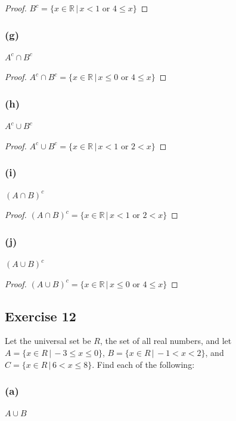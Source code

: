 \documentclass[14pt]{extarticle}
\newcommand{\R}{\mathbb{R}}
\begin{document}
\begin{proof}
\(B^c = \{x \in \R \, | \, x < 1 \text{ or } 4 \leq x\}\)
\end{proof}

\subsubsection{(g)}
$A^c \cap B^c$

\begin{proof}
\(A^c \cap B^c = \{x \in \R \, | \, x \leq 0 \text{ or } 4 \leq x\}\)
\end{proof}

\subsubsection{(h)}
$A^c \cup B^c$

\begin{proof}
\(A^c \cup B^c = \{x \in \R \, | \, x < 1 \text{ or } 2 < x\}\)
\end{proof}

\subsubsection{(i)}
$(A \cap B)^c$

\begin{proof}
\((A \cap B)^c = \{x \in \R \, | \, x < 1 \text{ or } 2 < x\}\)
\end{proof}

\subsubsection{(j)}
$(A \cup B)^c$

\begin{proof}
\((A \cup B)^c = \{x \in \R \, | \, x \leq 0 \text{ or } 4 \leq x\}\)
\end{proof}

\subsection{Exercise 12}
Let the universal set be $R$, the set of all real numbers, and let \(A = \{x \in R \,|\, -3 \leq x \leq 0\}\), \(B = 
\{x \in R \, | \, -1 < x < 2\}\), and \(C = \{x \in R \, | \, 6 < x \leq 8\}\). Find each of the following:

\subsubsection{(a)}
$A \cup B$
\end{document}
